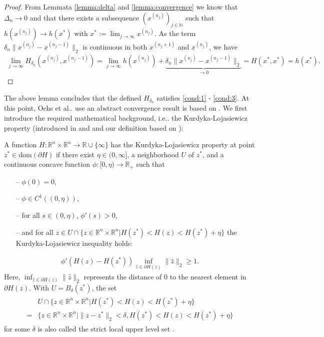 \documentclass[onecolumn,final,a4paper,13pt,reqno]{siamart}
\makeatletter
\DeclareRobustCommand\onedot{\futurelet\@let@token\@onedot}
\def\@onedot{\ifx\@let@token.\else.\null\fi\xspace}
\def\ie{{i.e}\onedot} \def\Ie{{I.e}\onedot}
\def\etal{{et al}\onedot}
\def\dom{\text{dom}}
\makeatother
\begin{document}
\begin{proof}
	From Lemmata \ref{lemma:delta} and \ref{lemma:convergence} we know that $\Delta_n \rightarrow 0$ and that there exists a subsequence $(x^{(n_j)})_{j \in \mathbb{N}}$ such that $h(x^{(n_j)}) \rightarrow h(x^\ast)$ with $x^\ast := \lim_{j \rightarrow \infty} x^{(n_j)}$. As the term $\delta_n \|x^{(n_j)} - x^{(n_j - 1)}\|_2$ is continuous in both $x^{(n_j + 1)}$ and $x^{(n_j)}$, we have
	\begin{align}
		\lim_{j \rightarrow \infty} H_{\delta_n}(x^{(n_j)}, x^{(n_j - 1)})  = \lim_{j \rightarrow \infty} h(x^{(n_j)}) + \underbrace{\delta_n\|x^{(n_j)} - x^{(n_j - 1)}\|_2}_{\rightarrow 0} = H(x^\ast, x^\ast) = h(x^\ast).
	\end{align}
\end{proof}

The above lemma concludes that the defined $H_{\delta_n}$ satisfies \ref{cond:1} - \ref{cond:3}. At this point, Ochs \etal use an abstract convergence result is based on \cite{AttouchBolteSvaiter:2013}. We first introduce the required mathematical background, \ie the Kurdyka-Lojasiewicz property (introduced in \cite{Lojasiewicz:1993} and \cite{Kurdyka:1998} and our definition based on \cite{AttouchBolteRedontSoubeyran:2010}):

\begin{definitionmd}
	A function $H : \mathbb{R}^n \times \mathbb{R}^n \rightarrow \mathbb{R} \cup \{\infty\}$ has the Kurdyka-Lojasiewicz property at point $z^\ast \in \dom(\partial H)$ if there exist $\eta \in (0,\infty]$, a neighborhood $U$ of $z^\ast$, and a continuous concave function $\phi : [0, \eta) \rightarrow \mathbb{R}_{+}$ such that
	\begin{itemize}
		\item[--] $\phi(0) = 0$,
		\item[--] $\phi \in C^1((0, \eta))$,
		\item[--] for all $s \in (0, \eta)$, $\phi'(s) > 0$,
		\item[--] and for all $z \in U \cap \{z \in \mathbb{R}^n \times \mathbb{R}^n | H(z^\ast) < H(z) < H(z^\ast) + \eta\}$ the Kurdyka-Lojasiewicz inequality holds:
	\end{itemize}
	\begin{align}
		\phi'(H(z) - H(z^\ast)) \inf_{\hat{z} \in \partial H(z)}\|\hat{z}\|_2 \geq 1.\label{eq:kl-inequality}
	\end{align}
	Here, $\inf_{\hat{z} \in \partial H(z)}\|\hat{z}\|_2$ represents the distance of $0$ to the nearest element in $\partial H(z)$. With $U = B_\delta(z^\ast)$, the set
	\begin{align}
		\begin{aligned}
			&U \cap \{z \in \mathbb{R}^n \times \mathbb{R}^n | H(z^\ast) < H(z) < H(z^\ast) + \eta\}\\
			= &\{z \in \mathbb{R}^n \times \mathbb{R}^n | \|z - z^\ast\|_2 < \delta, H(z^\ast) < H(z) < H(z^\ast) + \eta\}
		\end{aligned}
	\end{align}
	for some $\delta$ is also called the strict local upper level set \cite{FrankelGarrigosPeypuquet:2015}.\label{def:kl}
\end{definitionmd}
\end{document}
